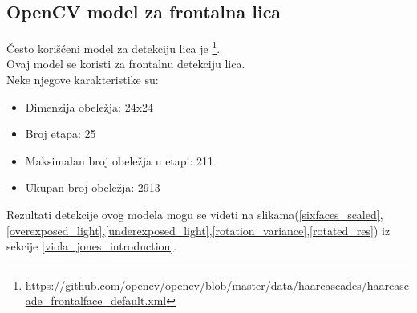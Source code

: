 \subsection{OpenCV model za frontalna lica}

Često korišćeni model za detekciju lica je
\texttt{}\footnote{\url{https://github.com/opencv/opencv/blob/master/data/haarcascades/haarcascade_frontalface_default.xml}}. \\
Ovaj model se koristi za frontalnu detekciju lica. \\
Neke njegove karakteristike su:
\begin{itemize}
\item Dimenzija obeležja: 24x24
\item Broj etapa: 25
\item Maksimalan broj obeležja u etapi: 211
\item Ukupan broj obeležja: 2913
\end{itemize}

\noindent
Rezultati detekcije ovog modela mogu se videti na
slikama(\ref{sixfaces_scaled},\ref{overexposed_light},\ref{underexposed_light},\ref{rotation_variance},\ref{rotated_res})
iz sekcije \ref{viola_jones_introduction}.